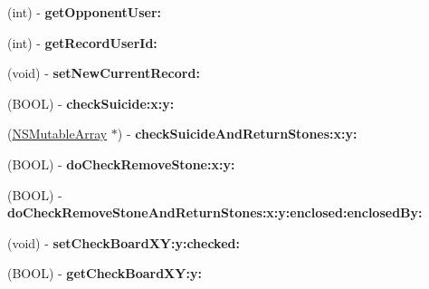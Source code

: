 \begin{DoxyCompactItemize}
\item 
\hypertarget{interface_games_a47becd0c290f96ce3fd635a1d3c17af8}{
(int) -\/ {\bfseries getOpponentUser:}}
\label{interface_games_a47becd0c290f96ce3fd635a1d3c17af8}

\item 
\hypertarget{interface_games_a0478be8859388476b846e6840b5abf26}{
(int) -\/ {\bfseries getRecordUserId:}}
\label{interface_games_a0478be8859388476b846e6840b5abf26}

\item 
\hypertarget{interface_games_aac304863fcdaa29bd627766ea24ea5d5}{
(void) -\/ {\bfseries setNewCurrentRecord:}}
\label{interface_games_aac304863fcdaa29bd627766ea24ea5d5}

\item 
\hypertarget{interface_games_ab105dfc06c682a58a0bc9421425635a6}{
(BOOL) -\/ {\bfseries checkSuicide:x:y:}}
\label{interface_games_ab105dfc06c682a58a0bc9421425635a6}

\item 
\hypertarget{interface_games_abae461aa449e572d9706ff5837f0e3cd}{
(\hyperlink{class_n_s_mutable_array}{NSMutableArray} $\ast$) -\/ {\bfseries checkSuicideAndReturnStones:x:y:}}
\label{interface_games_abae461aa449e572d9706ff5837f0e3cd}

\item 
\hypertarget{interface_games_af9c158e6105d8a0afb05fde82d0faefb}{
(BOOL) -\/ {\bfseries doCheckRemoveStone:x:y:}}
\label{interface_games_af9c158e6105d8a0afb05fde82d0faefb}

\item 
\hypertarget{interface_games_a35a940a5a3b0c9176b35106d38779a04}{
(BOOL) -\/ {\bfseries doCheckRemoveStoneAndReturnStones:x:y:enclosed:enclosedBy:}}
\label{interface_games_a35a940a5a3b0c9176b35106d38779a04}

\item 
\hypertarget{interface_games_a97f53c5367df474c90fb9ff869627bfb}{
(void) -\/ {\bfseries setCheckBoardXY:y:checked:}}
\label{interface_games_a97f53c5367df474c90fb9ff869627bfb}

\item 
\hypertarget{interface_games_a2d9c4ec95804f78a087188b0ea7eef87}{
(BOOL) -\/ {\bfseries getCheckBoardXY:y:}}
\label{interface_games_a2d9c4ec95804f78a087188b0ea7eef87}

\end{DoxyCompactItemize}
